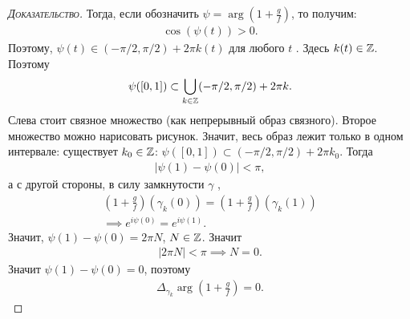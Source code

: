\documentclass[../complex-analysis.tex]{subfiles}
\begin{document}
\begin{proof}[\normalfont\textsc{Доказательство}]
 Тогда, если обозначить $ \psi = \arg \left( 1 + \frac{g}{f} \right) $, то получим:
 \begin{align*}
  \cos(\psi(t)) > 0.
 \end{align*} Поэтому, $ \psi(t) \in (- \pi / 2, \pi / 2) + 2\pi k (t) $ для любого  $ t $ . Здесь $ k(t) \in \mathbb{Z} $. Поэтому
  \begin{align*}
  \psi([0,1]) \subset \bigcup_{k \in \mathbb{Z}} (-\pi / 2, \pi / 2) + 2\pi k.
 \end{align*} Слева стоит связное множество (как непрерывный образ связного). Второе множество можно нарисовать {\color{red} рисунок}. Значит, весь образ лежит только в одном интервале: существует $ k_0 \in \mathbb{Z} $: $ \psi([0,1]) \subset (-\pi / 2, \pi / 2) + 2\pi k_0 $. Тогда
 \begin{align*}
  \left|\psi(1) - \psi(0) \right| < \pi,
 \end{align*} а с другой стороны, в силу замкнутости $\gamma$ ,
 \begin{align*}
  \left( 1+ \frac{g}{f} \right)(\gamma_k(0)) = \left(1 + \frac{g} f\right)(\gamma_k(1)) \\
  \implies e^{i\psi(0)} = e^{i\psi(1)}.
 \end{align*} Значит, $ \psi(1) - \psi(0) = 2\pi N $, $ N \in \mathbb{Z} $. Значит
 \begin{align*}
  \left|2\pi N \right| < \pi \implies N = 0.
 \end{align*} Значит $ \psi(1) -\psi(0)=0 $, поэтому
 \begin{align*}
  \Delta_{\gamma_k} \arg \left( 1 + \frac{g}{f} \right) = 0.
 \end{align*}

\end{proof}
\end{document}
